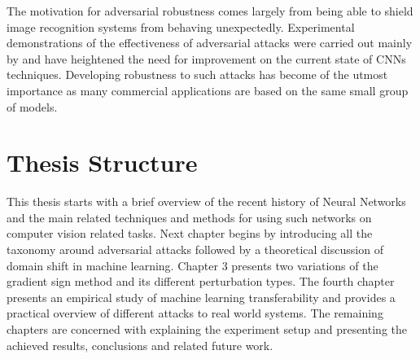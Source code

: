 The motivation for adversarial robustness comes largely from being able to shield image recognition systems from behaving unexpectedly. Experimental demonstrations of the effectiveness of adversarial attacks were carried out mainly by \cite{billovits,goodfellow2014,papernot2016} and have heightened the need for improvement on the current state of CNNs techniques. Developing robustness to such attacks has become of the utmost importance as many commercial applications are based on the same small group of models.

\section{Thesis Structure}

This thesis starts with a brief overview of the recent history of Neural Networks and the main related techniques and methods for using such networks on computer vision related tasks. Next chapter begins by introducing all the taxonomy around adversarial attacks followed by a theoretical discussion of domain shift in machine learning. Chapter 3 presents two variations of the gradient sign method and its different perturbation types. The fourth chapter presents an empirical study of machine learning transferability and provides a practical overview of different attacks to real world systems. The remaining chapters are concerned with explaining the experiment setup and presenting the achieved results, conclusions and related future work.
